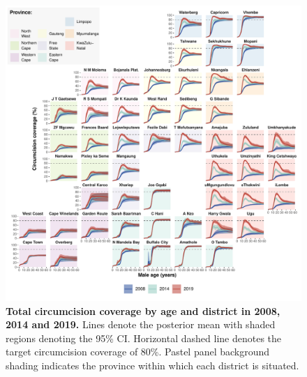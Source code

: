 \documentclass{article}
\begin{document}
\begin{figure}[H]
  \centering
  \includegraphics[width = \linewidth]{Figures/paper/Figure7.pdf}
  \caption{{\bf Total circumcision coverage by age and district in 2008, 2014 and 2019.} Lines denote the posterior mean with shaded regions denoting the 95\% CI. Horizontal dashed line denotes the target circumcision coverage of 80\%. Pastel panel background shading indicates the province within which each district is situated.}
  \label{fig::districtsingleageprev}
\end{figure}

\end{document}
